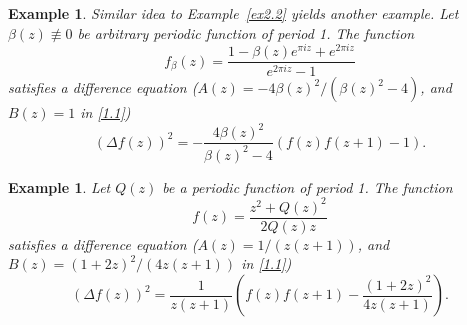 \documentclass{amsart}
\newtheorem{example}[theorem]{Example}
\begin{document}
\begin{example}\label{ex2.3} Similar idea to Example~\ref{ex2.2} yields another example.
Let $\beta(z)\not\equiv0$ be arbitrary periodic function of period 1. The function
\begin{equation}
f_\beta(z)=\frac{1-\beta(z) e^{\pi i z}+e^{2\pi i z}}{e^{2 \pi i z}-1}\label{2.4}
\end{equation}
satisfies a difference equation ($A(z)=-4\beta(z)^2/(\beta(z)^2-4)$, and $B(z)=1$ in \eqref{1.1})
\begin{equation}
(\Delta f(z))^2=-\frac{4\beta(z)^2}{\beta(z)^2-4}(f(z)f(z+1)-1).\label{2.5}
\end{equation}
\end{example}

\begin{example}\label{ex2.4}  Let $Q(z)$ be a periodic function of period 1. The function
\begin{equation}
f(z)=\frac{z^2+Q(z)^2}{2Q(z)z}\label{2.6}
\end{equation}
satisfies a difference equation ($A(z)=1/(z(z+1))$, and $B(z)=(1+2z)^2/(4z(z+1))$ in \eqref{1.1})
\begin{equation}
(\Delta f(z))^2=\frac{1}{z(z+1)}\left(f(z)f(z+1)-\frac{(1+2z)^2}{4z(z+1)}\right).\label{2.7}
\end{equation}
\end{example}

\end{document}
